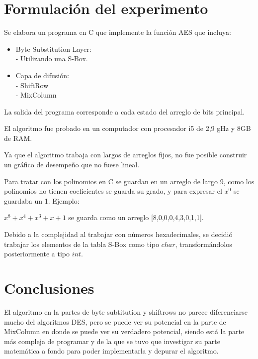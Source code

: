 \documentclass[12pt]{article}
\begin{document}
\newpage
\section{Formulación del experimento}
Se elabora un programa en C que implemente la función AES que incluya:\\
\begin{itemize}
\item Byte Substitution Layer:\\
- Utilizando una S-Box.
\item Capa de difusión:\\
- ShiftRow\\
- MixColumn
\end{itemize}

La salida del programa corresponde a cada estado del arreglo de bits principal.

El algoritmo fue probado en un computador con procesador i5 de 2,9 gHz y 8GB de RAM.

Ya que el algoritmo trabaja con largos de arreglos fijos, no fue posible construir un gráfico de desempeño que no fuese lineal.

Para tratar con los polinomios en C se guardan en un arreglo de largo 9, como los polinomios no tienen coeficientes se guarda su grado, y para expresar el $x^0$ se guardaba un 1. Ejemplo:

$  x^8 + x^4 + x^3 + x +1  $ se guarda como un arreglo [8,0,0,0,4,3,0,1,1].

Debido a la complejidad al trabajar con números hexadecimales, se decidió trabajar los elementos de la tabla S-Box como tipo $char$, transformándolos posteriormente a tipo $int$.

\section{Conclusiones}

El algoritmo en la partes de byte subtitution y shiftrows no parece diferenciarse mucho del algoritmos DES, pero se puede ver su potencial en la parte de  MixColumn en donde se puede ver su verdadero potencial, siendo está la parte más compleja de programar y de la que se tuvo que investigar su parte matemática a fondo para poder implementarla y depurar el algoritmo.
\end{document}

